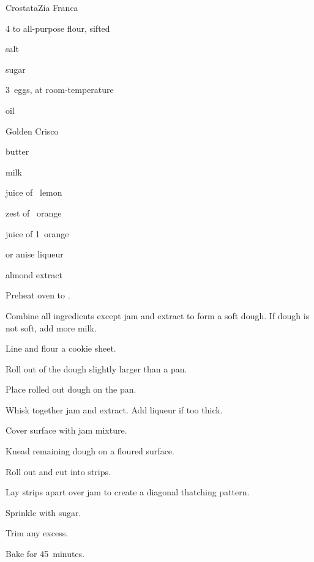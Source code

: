 \begin{recipe}{Crostata}{Zia Franca}{}

\begin{ingredients}
\item 4\half{} to  all-purpose flour, sifted
\item \tp{\quarter} salt
\item \Tp{2\half}
\item {} sugar
\item 3~eggs, at room-temperature
\item \C{\half} oil
\item \C{\quarter} Golden Crisco
\item \C{\quarter} butter
\item \C{\half} milk
\item juice of \half~lemon
\item zest of \half~orange
\item juice of 1~orange
\item {}  or anise liqueur
\item {} 
\item \tp{\half} almond extract
\end{ingredients}

\begin{directions}
\item Preheat oven to .
\item Combine all ingredients except jam and extract to form a soft dough. If dough is not soft, add more milk.
\item Line and flour a cookie sheet.
\item Roll out \twothird{} of the dough slightly larger than a pan.
\item Place rolled out dough on the pan.
\item Whisk together jam and extract. Add liqueur if too thick.
\item Cover surface with jam mixture.
\item Knead remaining dough on a floured surface.
\item Roll out and cut into \inch{\half} strips.
\item Lay strips  apart over jam to create a diagonal thatching pattern.
\item Sprinkle with sugar.
\item Trim any excess.
\item Bake for 45~minutes.
\end{directions}

\end{recipe}
